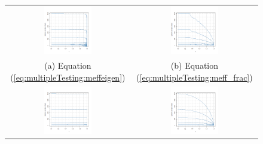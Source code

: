\documentclass[letterpaper,12pt,oneside,final]{article}
\begin{document}
\begin{figure}[htp]
\begin{center}
\begin{tabular}{cc}
\includegraphics[width = 0.4\textwidth]{./img/cheverudBounds.png} &
\includegraphics[width = 0.4\textwidth]{./img/lijiBounds.png} \\
{\footnotesize (a) Equation (\ref{eq:multipleTesting:meffeigen}) } & {\footnotesize (b) Equation (\ref{eq:multipleTesting:meff_frac})} \\
\includegraphics[width = 0.40\textwidth]{./img/edBounds.png} &
\includegraphics[width = 0.40\textwidth]{./img/galweyBounds.png} \\

\end{tabular}
\end{center}
\end{figure}
\end{document}
